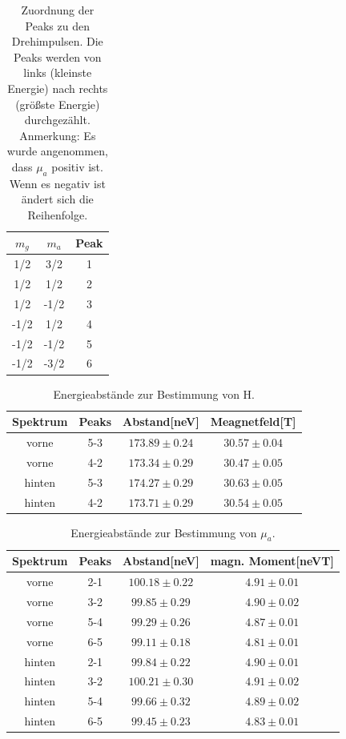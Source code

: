 \documentclass[12pt,a4paper]{article}
\begin{document}
\begin{table}
\centering
\begin{tabular}{|c|c|c|}
\hline 
$m_g$ & $m_a$ & Peak \\ 
\hline 
1/2 & 3/2 & 1 \\ 
\hline 
1/2 & 1/2 & 2 \\  
\hline 
1/2 & -1/2 & 3 \\ 
\hline 
-1/2 & 1/2 & 4 \\ 
\hline 
-1/2 & -1/2 & 5 \\ 
\hline 
-1/2 & -3/2 & 6 \\ 
\hline 
\end{tabular} 
\caption{Zuordnung der Peaks zu den Drehimpulsen. Die Peaks werden von links (kleinste Energie) nach rechts (größste Energie) durchgezählt. Anmerkung: Es wurde angenommen, dass $\mu_a$ positiv ist. Wenn es negativ ist ändert sich die Reihenfolge.}
\label{tab:Hyper_Zuordnung}
\end{table}

\begin{table}
\centering
\begin{tabular}{|c|c|c|c|}
\hline 
Spektrum & Peaks & Abstand[neV] & Meagnetfeld[T]\\ 
\hline 
vorne & 5-3 & $173.89\pm 0.24$ & $30.57\pm 0.04$\\ 
\hline 
vorne & 4-2 & $173.34\pm 0.29$& $30.47\pm 0.05$\\ 
\hline 
\hline 
hinten & 5-3 & $174.27\pm 0.29$ & $30.63\pm 0.05$\\ 
\hline 
hinten & 4-2 & $173.71\pm 0.29$& $30.54\pm 0.05$\\ 
\hline 
\end{tabular} 
\caption{Energieabstände zur Bestimmung von H.}
\label{tab:Hyper_H}
\end{table}

\begin{table}
\centering
\begin{tabular}{|c|c|c|c|}
\hline 
Spektrum & Peaks & Abstand[neV] & magn. Moment[neVT]\\ 
\hline 
vorne & 2-1 & $100.18 	\pm 0.22$ & $4.91\pm 0.01$\\ 
\hline 
vorne & 3-2 & $99.85\pm 0.29$& $4.90\pm 0.02$\\ 
\hline
vorne & 5-4 & $99.29\pm 0.26$& $4.87\pm 0.01$\\ 
\hline 
vorne & 6-5 & $99.11\pm 0.18$& $4.81\pm 0.01$\\ 
\hline 
\hline 
hinten & 2-1 & $99.84\pm 0.22$ & $4.90\pm 0.01$\\ 
\hline 
hinten & 3-2 & $100.21\pm 0.30$& $4.91\pm 0.02$\\ 
\hline
hinten & 5-4 & $99.66\pm 0.32$& $4.89\pm 0.02$\\ 
\hline 
hinten & 6-5 & $99.45\pm 0.23$& $4.83\pm 0.01$\\ 
\hline 
\end{tabular} 
\caption{Energieabstände zur Bestimmung von $\mu_a$.}
\label{tab:Hyper_mu}
\end{table}
\end{document}
